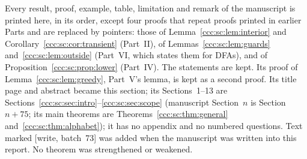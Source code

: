 \documentclass[11pt,letterpaper]{article}
\theoremstyle{definition}
\theoremstyle{remark}
\newcommand{\wsevthree}{\textup{[write, batch~73]}}
\begin{document}
Every result, proof, example, table, limitation and remark of the manuscript
is printed here, in its order, except four proofs that repeat proofs printed
in earlier Parts and are replaced by pointers: those of
Lemma~\ref{ccc:sc:lem:interior} and Corollary~\ref{ccc:sc:cor:transient}
(Part~II), of Lemmas~\ref{ccc:sc:lem:guards} and~\ref{ccc:sc:lem:outside}
(Part~VI, which states them for DFAs), and of
Proposition~\ref{ccc:sc:prop:lower} (Part~IV). The statements are kept. Its
proof of Lemma~\ref{ccc:sc:lem:greedy}, Part~V's lemma, is kept as a second
proof. Its title page and abstract became this section; its Sections~1--13
are Sections~\ref{ccc:sc:sec:intro}--\ref{ccc:sc:sec:scope} (manuscript
Section~$n$ is Section~$n+75$; its main theorems are
Theorems~\ref{ccc:sc:thm:general} and~\ref{ccc:sc:thm:alphabet}); it has no
appendix and no numbered questions. Text marked \wsevthree{} was added when
the manuscript was written into this report. No theorem was strengthened or
weakened.
\end{document}
